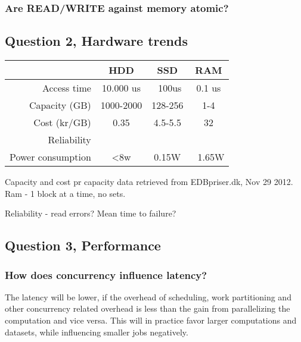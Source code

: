 \documentclass[11pt,a4paper]{article}
\begin{document}
\subsubsection{Are READ/WRITE against memory atomic?}

\subsection{Question 2, Hardware trends}

\begin{tabular}{|r|c|c|c|}
    \hline
                    & HDD & SSD & RAM\\\hline
    Access time     & 10.000 us & ~100us & 0.1 us\\\hline %
    Capacity (GB)   & 1000-2000 & 128-256 & 1-4 \\\hline
    Cost (kr/GB)    & 0.35 & 4.5-5.5 & 32 \\\hline
    Reliability     & & & \\\hline %
    Power consumption & <8w & 0.15W & ~1.65W \\\hline 

\end{tabular}
Capacity and cost pr capacity data retrieved from EDBpriser.dk, Nov 29 2012.
Ram - 1 block at a time, no sets.

Reliability - read errors? Mean time to failure?


\subsection{Question 3, Performance}
\subsubsection{How does concurrency influence latency?}

The latency will be lower, if the overhead of scheduling, work partitioning and
other concurrency related overhead is less than the gain from parallelizing the
computation and vice versa. This will in practice favor larger computations and
datasets, while influencing smaller jobs negatively.
\end{document}
